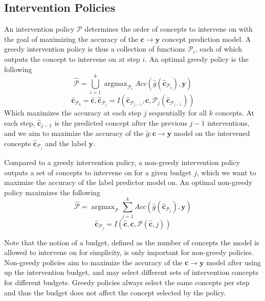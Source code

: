 \subsection{Intervention Policies}

An intervention policy $\mathcal{P}$ determines the order of concepts to intervene 
on with the goal of maximizing the accuracy of the $\mathbf{c} \to \mathbf{y}$ concept prediction model.
A greedy intervention policy is thus a collection of functions $\mathcal{P}_i$, each
of which outputs the concept to intervene on at step $i$. An optimal greedy policy is the following
\[\hat{\mathcal{P}} = \bigcup_{i=1}^k \mathop{\mathrm{argmax}}_{\mathcal{P}_i} Acc(\hat{g}(\hat{\mathbf{c}}_{\mathcal{P}_j}), \mathbf{y}) \]
\[\hat{\mathbf{c}}_{\mathcal{P}_0} = \hat{\mathbf{c}}, \hat{\mathbf{c}}_{\mathcal{P}_j} = I(\hat{\mathbf{c}}_{\mathcal{P}_{j-1}}, \mathbf{c}, \mathcal{P}_j(\hat{\mathbf{c}}_{\mathcal{P}_{j-1}}))\]
Which maximizes the accuracy at each step $j$ sequentially
for all $k$ concepts. At each
step, $\hat{\mathbf{c}}_{j-1}$ is 
the predicted concept after the previous $j-1$ interventions,
and we aim to maximize the accuracy of the $\hat{g}: \mathbf{c} \to \mathbf{y}$ model
on the intervened concepts $\hat{\mathbf{c}}_{\mathcal{P}_j}$ and the label $\mathbf{y}$.


Compared to a greedy intervention policy, a non-greedy intervention 
policy outputs a set of concepts to intervene on for a given budget $j$,
which we want to maximize the accuracy of the 
label predictor model on. An optimal non-greedy policy maximizes the following
\[\hat{\mathcal{P}} = \mathop{\mathrm{argmax}}_{\mathcal{P}} \sum_{j=1}^k Acc(\hat{g}(\hat{\mathbf{c}}_{\mathcal{P}_j}), \mathbf{y}) \]
\[\hat{\mathbf{c}}_{\mathcal{P}_j} = I(\hat{\mathbf{c}}, \mathbf{c}, \mathcal{P}(\hat{\mathbf{c}}, j))\]

Note that the notion of a budget, defined as the number
of concepts the model is allowed to intervene on for simplicity, is only
important for non-greedy policies. Non-greedy policies aim
to maximize the accuracy of the $\mathbf{c} \to \mathbf{y}$ model after using up the intervention budget,
and may select different sets of intervention concepts 
for different budgets. Greedy policies always select the same
concepts per step and thus the budget does not 
affect the concept selected by the policy.

